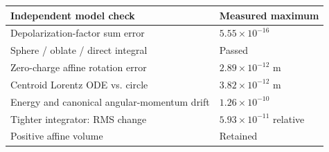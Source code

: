 \begin{tabular}{ll}
\toprule
Independent model check & Measured maximum \\
\midrule
Depolarization-factor sum error & $5.55\times10^{-16}$ \\
Sphere / oblate / direct integral & Passed \\
Zero-charge affine rotation error & $2.89\times10^{-12}$ m \\
Centroid Lorentz ODE vs. circle & $3.82\times10^{-12}$ m \\
Energy and canonical angular-momentum drift & $1.26\times10^{-10}$ \\
Tighter integrator: RMS change & $5.93\times10^{-11}$ relative \\
Positive affine volume & Retained \\
\bottomrule
\end{tabular}
